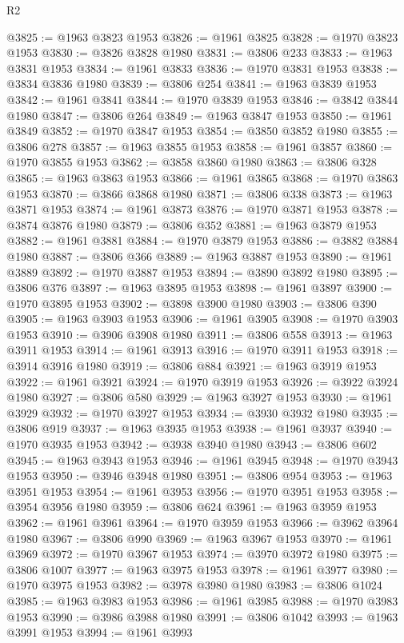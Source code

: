 \begin{lexlean}{R2}
\begin{coremodule}
@3825 := @1963 @3823 @1953
@3826 := @1961 @3825
@3828 := @1970 @3823 @1953
@3830 := @3826 @3828 @1980
@3831 := @3806 @233
@3833 := @1963 @3831 @1953
@3834 := @1961 @3833
@3836 := @1970 @3831 @1953
@3838 := @3834 @3836 @1980
@3839 := @3806 @254
@3841 := @1963 @3839 @1953
@3842 := @1961 @3841
@3844 := @1970 @3839 @1953
@3846 := @3842 @3844 @1980
@3847 := @3806 @264
@3849 := @1963 @3847 @1953
@3850 := @1961 @3849
@3852 := @1970 @3847 @1953
@3854 := @3850 @3852 @1980
@3855 := @3806 @278
@3857 := @1963 @3855 @1953
@3858 := @1961 @3857
@3860 := @1970 @3855 @1953
@3862 := @3858 @3860 @1980
@3863 := @3806 @328
@3865 := @1963 @3863 @1953
@3866 := @1961 @3865
@3868 := @1970 @3863 @1953
@3870 := @3866 @3868 @1980
@3871 := @3806 @338
@3873 := @1963 @3871 @1953
@3874 := @1961 @3873
@3876 := @1970 @3871 @1953
@3878 := @3874 @3876 @1980
@3879 := @3806 @352
@3881 := @1963 @3879 @1953
@3882 := @1961 @3881
@3884 := @1970 @3879 @1953
@3886 := @3882 @3884 @1980
@3887 := @3806 @366
@3889 := @1963 @3887 @1953
@3890 := @1961 @3889
@3892 := @1970 @3887 @1953
@3894 := @3890 @3892 @1980
@3895 := @3806 @376
@3897 := @1963 @3895 @1953
@3898 := @1961 @3897
@3900 := @1970 @3895 @1953
@3902 := @3898 @3900 @1980
@3903 := @3806 @390
@3905 := @1963 @3903 @1953
@3906 := @1961 @3905
@3908 := @1970 @3903 @1953
@3910 := @3906 @3908 @1980
@3911 := @3806 @558
@3913 := @1963 @3911 @1953
@3914 := @1961 @3913
@3916 := @1970 @3911 @1953
@3918 := @3914 @3916 @1980
@3919 := @3806 @884
@3921 := @1963 @3919 @1953
@3922 := @1961 @3921
@3924 := @1970 @3919 @1953
@3926 := @3922 @3924 @1980
@3927 := @3806 @580
@3929 := @1963 @3927 @1953
@3930 := @1961 @3929
@3932 := @1970 @3927 @1953
@3934 := @3930 @3932 @1980
@3935 := @3806 @919
@3937 := @1963 @3935 @1953
@3938 := @1961 @3937
@3940 := @1970 @3935 @1953
@3942 := @3938 @3940 @1980
@3943 := @3806 @602
@3945 := @1963 @3943 @1953
@3946 := @1961 @3945
@3948 := @1970 @3943 @1953
@3950 := @3946 @3948 @1980
@3951 := @3806 @954
@3953 := @1963 @3951 @1953
@3954 := @1961 @3953
@3956 := @1970 @3951 @1953
@3958 := @3954 @3956 @1980
@3959 := @3806 @624
@3961 := @1963 @3959 @1953
@3962 := @1961 @3961
@3964 := @1970 @3959 @1953
@3966 := @3962 @3964 @1980
@3967 := @3806 @990
@3969 := @1963 @3967 @1953
@3970 := @1961 @3969
@3972 := @1970 @3967 @1953
@3974 := @3970 @3972 @1980
@3975 := @3806 @1007
@3977 := @1963 @3975 @1953
@3978 := @1961 @3977
@3980 := @1970 @3975 @1953
@3982 := @3978 @3980 @1980
@3983 := @3806 @1024
@3985 := @1963 @3983 @1953
@3986 := @1961 @3985
@3988 := @1970 @3983 @1953
@3990 := @3986 @3988 @1980
@3991 := @3806 @1042
@3993 := @1963 @3991 @1953
@3994 := @1961 @3993

\end{coremodule}
\end{lexlean}
